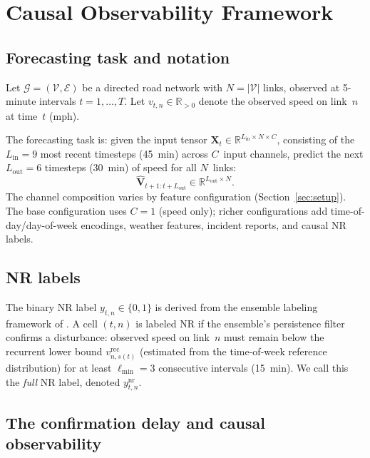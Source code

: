 \documentclass[a4paper]{cas-sc}
\newcommand{\fullnr}{y^{\mathrm{nr}}}
\begin{document}
\section{Causal Observability Framework}
\label{sec:framework}

\subsection{Forecasting task and notation}

Let $\mathcal{G} = (\mathcal{V}, \mathcal{E})$ be a directed road network
with $N = |\mathcal{V}|$ links, observed at 5-minute intervals
$t = 1, \dots, T$.
Let $v_{t,n} \in \mathbb{R}_{>0}$ denote the observed speed on link~$n$
at time~$t$ (mph).

The forecasting task is: given the input tensor
$\mathbf{X}_t \in \mathbb{R}^{L_{\mathrm{in}} \times N \times C}$, consisting
of the $L_{\mathrm{in}} = 9$ most recent timesteps (45~min) across
$C$~input channels, predict the next $L_{\mathrm{out}} = 6$ timesteps
(30~min) of speed for all $N$~links:
\begin{equation}
  \hat{\mathbf{V}}_{t+1:t+L_{\mathrm{out}}} \in \mathbb{R}^{L_{\mathrm{out}} \times N}.
  \label{eq:task}
\end{equation}
The channel composition varies by feature configuration (Section~\ref{sec:setup}).
The base configuration uses $C=1$ (speed only); richer configurations
add time-of-day/day-of-week encodings, weather features, incident reports,
and causal NR labels.

\subsection{NR labels}

The binary NR label $y_{t,n} \in \{0,1\}$ is derived from the ensemble
labeling framework of \citet{bae2026labeling}.
A cell $(t,n)$ is labeled NR if the ensemble's persistence filter
confirms a disturbance: observed speed on link~$n$ must remain below
the recurrent lower bound $v^{\mathrm{rec}}_{n,s(t)}$ (estimated
from the time-of-week reference distribution) for at least $\ell_{\min} = 3$
consecutive intervals (15~min).
We call this the \emph{full} NR label, denoted $\fullnr_{t,n}$.

\subsection{The confirmation delay and causal observability}
\label{sec:causal}
\end{document}
